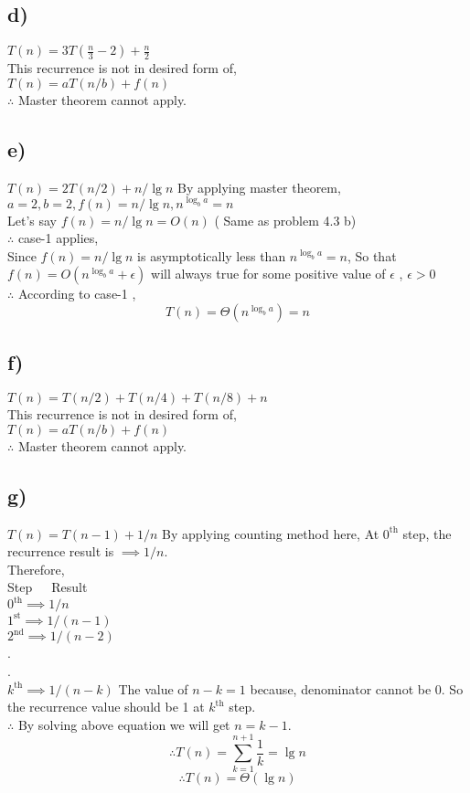 \documentclass[a4paper, 11pt]{article}
\begin{document}
\subsection*{d)}
$T(n) =3T(\frac{n}{3} -2) + \frac{n}{2}$\\
This recurrence is not in desired form of,\\
$T(n) = aT(n/b) + f(n)$\\
$\therefore $ Master theorem cannot apply.

\subsection*{e)}
$T(n) = 2T(n/2) + n/ \lg n$
By applying master theorem, \\
$a=2 , b=2, f(n) = n/ \lg n ,  n^{\log_{b}a} = n$\\
Let's say $f(n)= n/ \lg n = O(n)$ ( Same as problem 4.3 b)\\
$\therefore$ case-1 applies,\\
Since $f(n) = n/ \lg n$ is asymptotically less than  $n^{\log_{b}a} = n$, So that $f(n) = O(n^{\log_{b}a}+\epsilon)$ will always true for some positive value of $\epsilon$ , $\epsilon > 0$\\
$\therefore$ According to case-1 ,
$$T(n) = \Theta ( n^{\log_{b}a}) = n $$


\subsection*{f)}
$T(n) = T(n/2) + T(n/4) + T(n/8) + n$\\
This recurrence is not in desired form of,\\
$T(n) = aT(n/b) + f(n)$\\
$\therefore $ Master theorem cannot apply. 

\subsection*{g)}
$T(n) = T(n-1) + 1/n$
By applying counting method here,
At $0^{\text{th}}$ step, the recurrence result is $\implies 1/n$.\\
Therefore,\\
Step \,\,\,\,\, Result\\
$0^{\text{th}} \implies 1/n$\\
$1^{\text{st}} \implies 1/(n-1)$\\
$2^{\text{nd}} \implies 1/(n-2)$\\
.\\
.\\  
$k^{\text{th}} \implies 1/(n-k)$ The value of $n-k = 1 $ because, denominator cannot be 0. So the recurrence value should be 1 at $k^{\text{th}}$ step. \\
$\therefore $ By solving above equation we will get $n=k-1$.
$$\therefore T(n) = \sum_{k=1}^{n+1} \frac{1}{k} = \lg n$$
$$\therefore T(n) = \Theta (\lg n)$$
\end{document}
